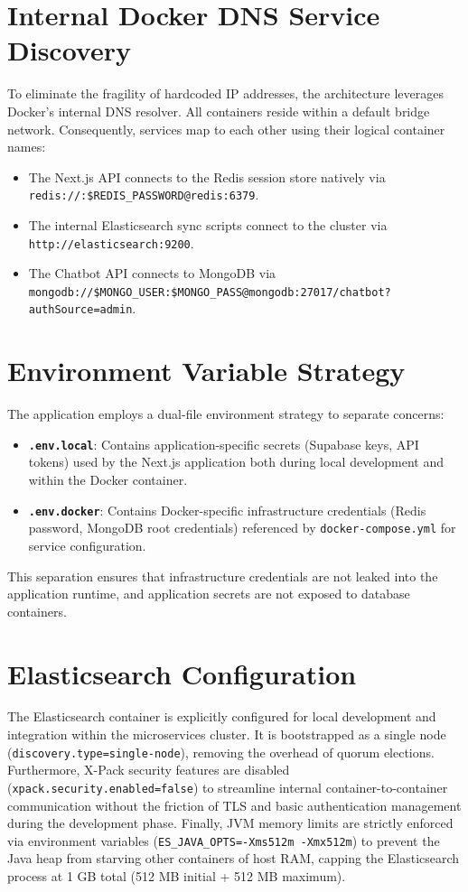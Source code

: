 \section{Internal Docker DNS Service Discovery}
To eliminate the fragility of hardcoded IP addresses, the architecture leverages Docker's internal DNS resolver. All containers reside within a default bridge network. Consequently, services map to each other using their logical container names:
\begin{itemize}
\item The Next.js API connects to the Redis session store natively via \texttt{redis://:\${REDIS\_PASSWORD}@redis:6379}.
\item The internal Elasticsearch sync scripts connect to the cluster via \texttt{http://elasticsearch:9200}.
\item The Chatbot API connects to MongoDB via \texttt{mongodb://\${MONGO\_USER}:\${MONGO\_PASS}@mongodb:27017/chatbot?authSource=admin}.
\end{itemize}

\section{Environment Variable Strategy}
The application employs a dual-file environment strategy to separate concerns:
\begin{itemize}
\item \textbf{\texttt{.env.local}}: Contains application-specific secrets (Supabase keys, API tokens) used by the Next.js application both during local development and within the Docker container.
\item \textbf{\texttt{.env.docker}}: Contains Docker-specific infrastructure credentials (Redis password, MongoDB root credentials) referenced by \texttt{docker-compose.yml} for service configuration.
\end{itemize}

This separation ensures that infrastructure credentials are not leaked into the application runtime, and application secrets are not exposed to database containers.

\section{Elasticsearch Configuration}
The Elasticsearch container is explicitly configured for local development and integration within the microservices cluster. It is bootstrapped as a single node (\texttt{discovery.type=single-node}), removing the overhead of quorum elections. Furthermore, X-Pack security features are disabled (\texttt{xpack.security.enabled=false}) to streamline internal container-to-container communication without the friction of TLS and basic authentication management during the development phase. Finally, JVM memory limits are strictly enforced via environment variables (\texttt{ES\_JAVA\_OPTS=-Xms512m -Xmx512m}) to prevent the Java heap from starving other containers of host RAM, capping the Elasticsearch process at 1 GB total (512 MB initial + 512 MB maximum).

